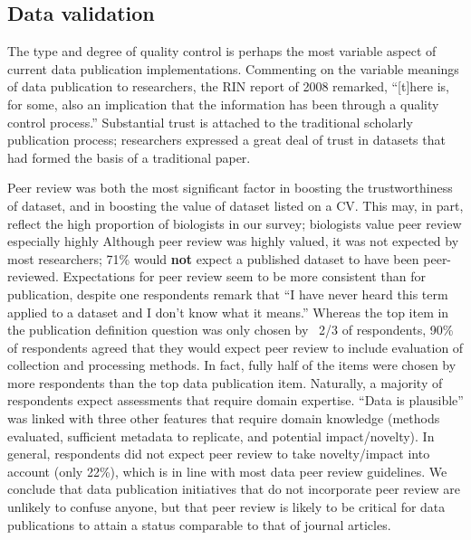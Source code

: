 \documentclass[10pt]{article}
\begin{document}
\subsection*{Data validation}

The type and degree of quality control is perhaps the most variable aspect of current data publication implementations. 
Commenting on the variable meanings of data publication to researchers, the RIN report of 2008 remarked, ``[t]here is, for some, also an implication that the information has been through a quality control process.''\cite{swan_share_2008}
Substantial trust is attached to the traditional scholarly publication process; researchers expressed a great deal of trust in datasets that had formed the basis of a traditional paper.

Peer review was both the most significant factor in boosting the trustworthiness of dataset, and in boosting the value of dataset listed on a CV.
This may, in part, reflect the high proportion of biologists in our survey; biologists value peer review especially highly\cite{harley_assessing_2010}
Although peer review was highly valued, it was not expected by most researchers; 71\% would \textbf{not} expect a published dataset to have been peer-reviewed.
Expectations for peer review seem to be more consistent than for publication, despite one respondents remark that ``I have never heard this term applied to a dataset and I don't know what it means.''
Whereas the top item in the publication definition question was only chosen by ~2/3 of respondents, 90\% of respondents agreed that they would expect peer review to include evaluation of collection and processing methods.
In fact, fully half of the items were chosen by more respondents than the top data publication item.
Naturally, a majority of respondents expect assessments that require domain expertise.
``Data is plausible'' was linked with three other features that require domain knowledge (methods evaluated, sufficient metadata to replicate, and potential impact/novelty).
In general, respondents did not expect peer review to take novelty/impact into account (only 22\%), which is in line with most data peer review guidelines.
We conclude that data publication initiatives that do not incorporate peer review are unlikely to confuse anyone, but that peer review is likely to be critical for data publications to attain a status comparable to that of journal articles.
\end{document}
